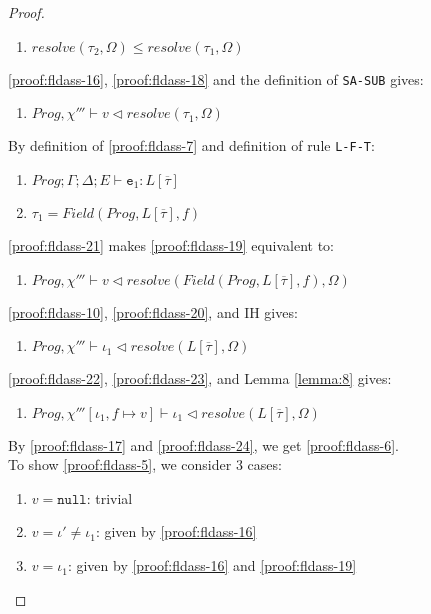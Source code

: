 \begin{proof}
\begin{enumerate}[label=\arabic*), resume]
    \item \label{proof:fldass-18} $resolve(\tau_2, \Omega) \leq resolve(\tau_1, \Omega)$ 
\end{enumerate}
\ref{proof:fldass-16}, \ref{proof:fldass-18} and the definition of \texttt{SA-SUB} gives:
\begin{enumerate}[label=\arabic*), resume]
    \item \label{proof:fldass-19} $Prog, \chi''' \vdash v \triangleleft resolve(\tau_1, \Omega)$ 
\end{enumerate}
By definition of \ref{proof:fldass-7} and definition of rule \texttt{L-F-T}:
\begin{enumerate}[label=\arabic*), resume]
    \item \label{proof:fldass-20} $Prog; \Gamma; \Delta; E \vdash \texttt{e}_1 : L[\overline{\tau}]$
    \item \label{proof:fldass-21} $\tau_1 = Field(Prog, L[\overline{\tau}], f)$
\end{enumerate}
\ref{proof:fldass-21} makes \ref{proof:fldass-19} equivalent to:
\begin{enumerate}[label=\arabic*), resume]
    \item \label{proof:fldass-22} $Prog, \chi''' \vdash v \triangleleft resolve(Field(Prog, L[\overline{\tau}]
    , f), \Omega)$ 
\end{enumerate}
\ref{proof:fldass-10}, \ref{proof:fldass-20}, and IH gives:
\begin{enumerate}[label=\arabic*), resume]
    \item \label{proof:fldass-23} $Prog, \chi''' \vdash \iota_1 \triangleleft resolve(L[\overline{\tau}], \Omega)$ 
\end{enumerate}
\ref{proof:fldass-22}, \ref{proof:fldass-23}, and Lemma \ref{lemma:8} gives:
\begin{enumerate}[label=\arabic*), resume]
    \item \label{proof:fldass-24} $Prog, \chi'''[\iota_1, f \mapsto v] \vdash \iota_1 \triangleleft resolve(L[\overline{\tau}], \Omega)$ 
\end{enumerate}
By \ref{proof:fldass-17} and \ref{proof:fldass-24}, we get \ref{proof:fldass-6}. \\
To show \ref{proof:fldass-5}, we consider 3 cases:
\begin{enumerate}
    \item \label{proof:fldass-case1} $v = \texttt{null}$: trivial
    \item \label{proof:fldass-case2} $v = \iota' \neq \iota_1$: given by \ref{proof:fldass-16}
    \item \label{proof:fldass-case3} $v = \iota_1$: given by \ref{proof:fldass-16} and \ref{proof:fldass-19}
\end{enumerate}
\end{proof}

